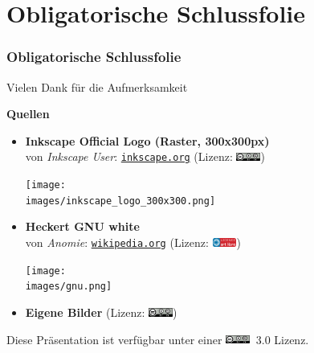 \documentclass[german]{beamer} %
\newcommand{\images}{vektorzeichnen/}
\newcommand{\ccbysa}{\href{https://creativecommons.org/licenses/by-sa/3.0/deed.de}{\includegraphics[height=0.11in]{licenses/cc-by-sa.png}}}
\newcommand{\artlibre}{\href{http://artlibre.org/licence/lal/de/}{\includegraphics[height=0.11in]{licenses/art_libre.png}}}
\begin{document}












 

\section{Obligatorische Schlussfolie}
\begin{frame}
  \frametitle{Obligatorische Schlussfolie}
  
  \begin{block}{Vielen Dank für die Aufmerksamkeit}\end{block}
  
  \textbf{Quellen}
  \begin{itemize}
  	\item \textbf{Inkscape Official Logo (Raster, 300x300px)}\\ von \textit{Inkscape User}: \href{https://inkscape.org/en/gallery/item/1088/}{\texttt{inkscape.org}} (Lizenz: \ccbysa) \par
  	        \begin{minipage}{\linewidth}
  	            \centering
  	            \texttt{[image: \\images/inkscape\_logo\_300x300.png]}
  	        \end{minipage}
  			

  	\item \textbf{Heckert GNU white}\\ von \textit{Anomie}: \href{https://en.wikipedia.org/wiki/File:Heckert_GNU_white.svg}{\texttt{wikipedia.org}} (Lizenz: \artlibre) \par
  	        \begin{minipage}{\linewidth}
  	            \centering
  	            \texttt{[image: \\images/gnu.png]}
  	        \end{minipage}
  			
  	\item \textbf{Eigene Bilder} (Lizenz: \ccbysa)
  \end{itemize}
  
  \begin{block}{Diese Präsentation ist verfügbar unter einer \ccbysa $\ $ 3.0 Lizenz.}\end{block}
  
 \end{frame}

\end{document}
